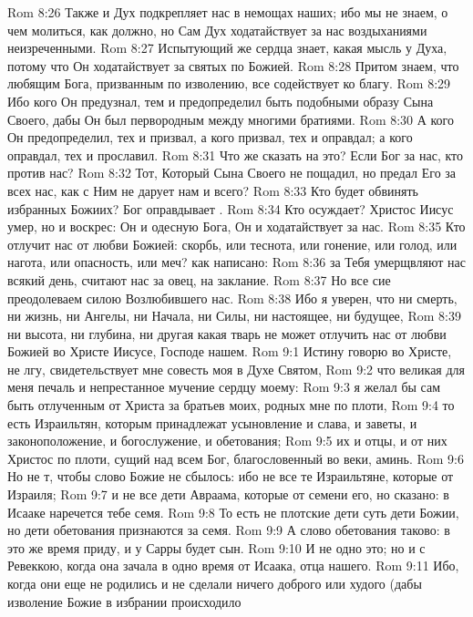 \rsbpar\vs Rom 8:26 Также и Дух подкрепляет нас в немощах наших; ибо мы не знаем, о чем молиться, как должно, но Сам Дух ходатайствует за нас воздыханиями неизреченными.
\vs Rom 8:27 Испытующий же сердца знает, какая мысль у Духа, потому что Он ходатайствует за святых по  Божией.
\vs Rom 8:28 Притом знаем, что любящим Бога, призванным по  изволению, все содействует ко благу.
\vs Rom 8:29 Ибо кого Он предузнал, тем и предопределил быть подобными образу Сына Своего, дабы Он был первородным между многими братиями.
\vs Rom 8:30 А кого Он предопределил, тех и призвал, а кого призвал, тех и оправдал; а кого оправдал, тех и прославил.
\vs Rom 8:31 Что же сказать на это? Если Бог за нас, кто против нас?
\vs Rom 8:32 Тот, Который Сына Своего не пощадил, но предал Его за всех нас, как с Ним не дарует нам и всего?
\vs Rom 8:33 Кто будет обвинять избранных Божиих? Бог оправдывает .
\vs Rom 8:34 Кто осуждает? Христос Иисус умер, но и воскрес: Он и одесную Бога, Он и ходатайствует за нас.
\vs Rom 8:35 Кто отлучит нас от любви Божией: скорбь, или теснота, или гонение, или голод, или нагота, или опасность, или меч? как написано:
\vs Rom 8:36 за Тебя умерщвляют нас всякий день, считают нас за овец,  на заклание.
\vs Rom 8:37 Но все сие преодолеваем силою Возлюбившего нас.
\vs Rom 8:38 Ибо я уверен, что ни смерть, ни жизнь, ни Ангелы, ни Начала, ни Силы, ни настоящее, ни будущее,
\vs Rom 8:39 ни высота, ни глубина, ни другая какая тварь не может отлучить нас от любви Божией во Христе Иисусе, Господе нашем.
\vs Rom 9:1 Истину говорю во Христе, не лгу, свидетельствует мне совесть моя в Духе Святом,
\vs Rom 9:2 что великая для меня печаль и непрестанное мучение сердцу моему:
\vs Rom 9:3 я желал бы сам быть отлученным от Христа за братьев моих, родных мне по плоти,
\vs Rom 9:4 то есть Израильтян, которым принадлежат усыновление и слава, и заветы, и законоположение, и богослужение, и обетования;
\vs Rom 9:5 их и отцы, и от них Христос по плоти, сущий над всем Бог, благословенный во веки, аминь.
\vs Rom 9:6 Но не т, чтобы слово Божие не сбылось: ибо не все те Израильтяне, которые от Израиля;
\vs Rom 9:7 и не все дети Авраама, которые от семени его, но сказано: в Исааке наречется тебе семя.
\vs Rom 9:8 То есть не плотские дети суть дети Божии, но дети обетования признаются за семя.
\vs Rom 9:9 А слово обетования таково: в это же время приду, и у Сарры будет сын.
\vs Rom 9:10 И не одно это; но  и с Ревеккою, когда она зачала в одно время  от Исаака, отца нашего.
\vs Rom 9:11 Ибо, когда они еще не родились и не сделали ничего доброго или худого (дабы изволение Божие в избрании происходило
